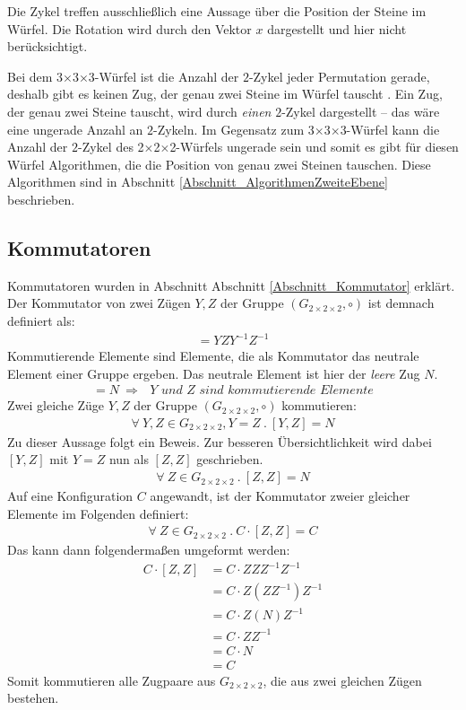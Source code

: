 \documentclass[12pt,a4paper, usenames, dvipsnames]{article}
\theoremstyle{mystyle}
\theoremstyle{definition}
\newcommand{\Gtwo}{\ensuremath{G_{2\times 2\times 2}}}
\newcommand{\Ttwo}{2$\times$2$\times$2-}
\newcommand{\Tthree}{3$\times$3$\times$3-}
\begin{document}
Die Zykel treffen ausschließlich eine Aussage über die Position der Steine im Würfel. Die Rotation wird durch den Vektor $x$ dargestellt und hier nicht berücksichtigt. 

Bei dem \Tthree Würfel ist die Anzahl der $2$-Zykel jeder Permutation gerade, deshalb gibt es keinen Zug, der genau zwei Steine im Würfel tauscht \cite{TD}. Ein Zug, der genau zwei Steine tauscht, wird durch \textit{einen} $2$-Zykel dargestellt -- das wäre eine ungerade Anzahl an $2$-Zykeln. Im Gegensatz zum \Tthree Würfel kann die Anzahl der $2$-Zykel des \Ttwo Würfels ungerade sein und somit es gibt für diesen Würfel Algorithmen, die die Position von genau zwei Steinen tauschen. Diese Algorithmen sind in Abschnitt \ref{Abschnitt_AlgorithmenZweiteEbene} beschrieben. 

%
%
%
%
%
%
%
%
%
%
%
%
%
%
%
%
%
%
%
%
\subsection{Kommutatoren}
\label{Abschnitt_Kommutatoren8}

Kommutatoren wurden in Abschnitt Abschnitt \ref{Abschnitt_Kommutator} erklärt. Der Kommutator von zwei Zügen $Y, Z$ der Gruppe $(\Gtwo, \circ)$ ist demnach definiert als:
\begin{align*}
[Y,Z]=YZY^{-1}Z^{-1}
\end{align*}
Kommutierende Elemente sind Elemente, die als Kommutator das neutrale Element einer Gruppe ergeben. Das neutrale Element ist hier der \textit{leere} Zug $N$.
\begin{align*}
[Y,Z]= N\ \Rightarrow \textit{ $Y$ und $Z$ sind kommutierende Elemente}
\end{align*}
Zwei gleiche Züge $Y, Z$ der Gruppe $(\Gtwo, \circ)$ kommutieren:
\begin{align*}
\forall \ Y, Z \in \Gtwo, Y = Z \ . \ [Y, Z] = N
\end{align*}
Zu dieser Aussage folgt ein Beweis. Zur besseren Übersichtlichkeit wird dabei $[Y,Z]$ mit $Y=Z$ nun als $[Z,Z]$ geschrieben.
\begin{align*}
\forall \ Z \in \Gtwo\ . \ [Z, Z] = N
\end{align*}
Auf eine Konfiguration $C$ angewandt, ist der Kommutator zweier gleicher Elemente im Folgenden definiert:
\begin{align*}
\forall \ Z \in \Gtwo\ . \ C \cdot [Z, Z] = C
\end{align*}
Das kann dann folgendermaßen umgeformt werden:
\begin{align*}
C \cdot [Z, Z] & = C \cdot ZZZ^{-1}Z^{-1} \\
& = C \cdot Z(ZZ^{-1})Z^{-1} \\
& = C \cdot Z(N)Z^{-1} \\
& = C \cdot ZZ^{-1} \\
& = C \cdot N \\
& = C
\end{align*}
Somit kommutieren alle Zugpaare aus $\Gtwo$, die aus zwei gleichen Zügen bestehen.
\end{document}
